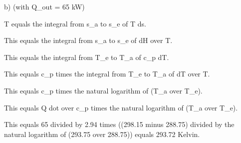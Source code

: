 b) (with Q_out = 65 kW)

T equals the integral from s_a to s_e of T ds.

This equals the integral from s_a to s_e of dH over T.

This equals the integral from T_e to T_a of c_p dT.

This equals c_p times the integral from T_e to T_a of dT over T.

This equals c_p times the natural logarithm of (T_a over T_e).

This equals Q dot over c_p times the natural logarithm of (T_a over T_e).

This equals 65 divided by 2.94 times ((298.15 minus 288.75) divided by the natural logarithm of (293.75 over 288.75)) equals 293.72 Kelvin.